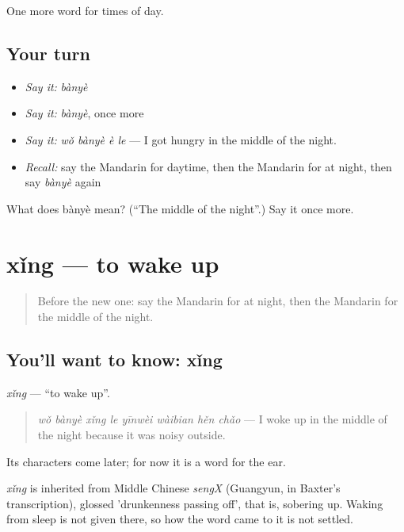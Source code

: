 \begin{grammarlens}[title={What you've built}]
One more word for times of day.
\end{grammarlens}

\subsection*{Your turn}
\begin{itemize}
\raggedright
  \item \emph{Say it:} \emph{bànyè}
  \item \emph{Say it:} \emph{bànyè}, once more
  \item \emph{Say it:} \emph{wǒ bànyè è le} — I got hungry in the middle of the night.
  \item \emph{Recall:} say the Mandarin for daytime, then the Mandarin for at night, then say \emph{bànyè} again
\end{itemize}

\begin{tcolorbox}[breakable,colback=teal!4,colframe=teal!35!black,title={Before you move on}]
What does bànyè mean? (\textquotedblleft{}The middle of the night\textquotedblright{}.) Say it once more.
\end{tcolorbox}
\section[xǐng]{xǐng — to wake up}

\label{lesson:ZH-C146-xing-wake}



\begin{quote}
Before the new one: say the Mandarin for at night, then the Mandarin for the middle of the night.
\end{quote}

\subsection*{You'll want to know: xǐng}
\emph{xǐng} — \textquotedblleft{}to wake up\textquotedblright{}.

\begin{quote}
\emph{wǒ bànyè xǐng le yīnwèi wàibian hěn chǎo} — I woke up in the middle of the night because it was noisy outside.
\end{quote}

Its characters come later; for now it is a word for the ear.

\begin{cousinweb}
\emph{xǐng} is inherited from Middle Chinese \emph{sengX} (Guangyun, in Baxter's transcription), glossed 'drunkenness passing off', that is, sobering up. Waking from sleep is not given there, so how the word came to it is not settled.
\end{cousinweb}

